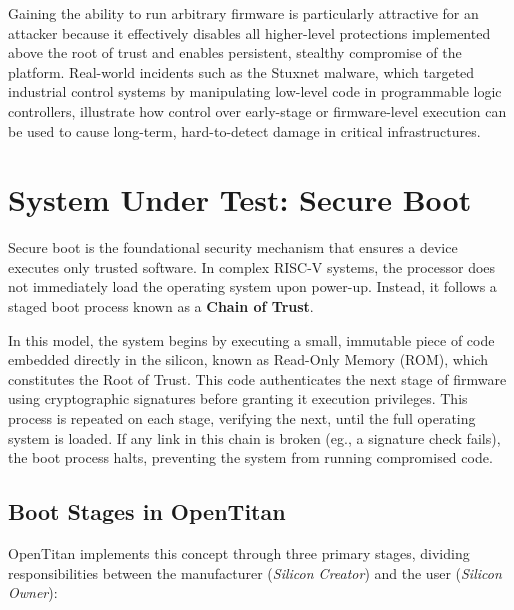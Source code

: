 \documentclass[10pt,a4paper,twocolumn,twoside]{article}
\begin{document}
Gaining the ability to run arbitrary firmware is particularly attractive for an attacker because it effectively disables all higher-level protections implemented above the root of trust and enables persistent, stealthy compromise of the platform. Real-world incidents such as the Stuxnet\cite{stuxnet} malware, which targeted industrial control systems by manipulating low-level code in programmable logic controllers, illustrate how control over early-stage or firmware-level execution can be used to cause long-term, hard-to-detect damage in critical infrastructures.

\section{System Under Test: Secure Boot}
Secure boot is the foundational security mechanism that ensures a device executes only trusted software. In complex RISC-V systems, the processor does not immediately load the operating system upon power-up. Instead, it follows a staged boot process known as a \textbf{Chain of Trust}.

In this model, the system begins by executing a small, immutable piece of code embedded directly in the silicon, known as Read-Only Memory (ROM), which constitutes the Root of Trust. This code authenticates the next stage of firmware using cryptographic signatures before granting it execution privileges. This process is repeated on each stage, verifying the next, until the full operating system is loaded. If any link in this chain is broken (eg., a signature check fails), the boot process halts, preventing the system from running compromised code.

\subsection{Boot Stages in OpenTitan}
OpenTitan implements this concept through three primary stages, dividing responsibilities between the manufacturer (\emph{Silicon Creator}) and the user (\emph{Silicon Owner}):
\end{document}
